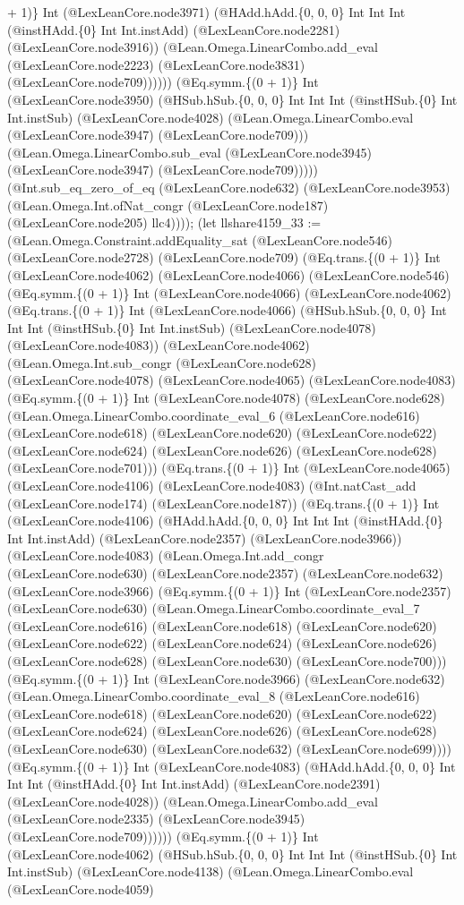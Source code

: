\documentclass[11pt]{article}
\begin{document}
+ 1)\} Int (@LexLeanCore.node3971) (@HAdd.hAdd.\{0, 0, 0\} Int Int Int (@instHAdd.\{0\} Int Int.instAdd) (@LexLeanCore.node2281) (@LexLeanCore.node3916)) (@Lean.Omega.LinearCombo.add\_eval (@LexLeanCore.node2223) (@LexLeanCore.node3831) (@LexLeanCore.node709)))))) (@Eq.symm.\{(0 + 1)\} Int (@LexLeanCore.node3950) (@HSub.hSub.\{0, 0, 0\} Int Int Int (@instHSub.\{0\} Int Int.instSub) (@LexLeanCore.node4028) (@Lean.Omega.LinearCombo.eval (@LexLeanCore.node3947) (@LexLeanCore.node709))) (@Lean.Omega.LinearCombo.sub\_eval (@LexLeanCore.node3945) (@LexLeanCore.node3947) (@LexLeanCore.node709))))) (@Int.sub\_eq\_zero\_of\_eq (@LexLeanCore.node632) (@LexLeanCore.node3953) (@Lean.Omega.Int.ofNat\_congr (@LexLeanCore.node187) (@LexLeanCore.node205) llc4)))); (let llshare4159\_33 := (@Lean.Omega.Constraint.addEquality\_sat (@LexLeanCore.node546) (@LexLeanCore.node2728) (@LexLeanCore.node709) (@Eq.trans.\{(0 + 1)\} Int (@LexLeanCore.node4062) (@LexLeanCore.node4066) (@LexLeanCore.node546) (@Eq.symm.\{(0 + 1)\} Int (@LexLeanCore.node4066) (@LexLeanCore.node4062) (@Eq.trans.\{(0 + 1)\} Int (@LexLeanCore.node4066) (@HSub.hSub.\{0, 0, 0\} Int Int Int (@instHSub.\{0\} Int Int.instSub) (@LexLeanCore.node4078) (@LexLeanCore.node4083)) (@LexLeanCore.node4062) (@Lean.Omega.Int.sub\_congr (@LexLeanCore.node628) (@LexLeanCore.node4078) (@LexLeanCore.node4065) (@LexLeanCore.node4083) (@Eq.symm.\{(0 + 1)\} Int (@LexLeanCore.node4078) (@LexLeanCore.node628) (@Lean.Omega.LinearCombo.coordinate\_eval\_6 (@LexLeanCore.node616) (@LexLeanCore.node618) (@LexLeanCore.node620) (@LexLeanCore.node622) (@LexLeanCore.node624) (@LexLeanCore.node626) (@LexLeanCore.node628) (@LexLeanCore.node701))) (@Eq.trans.\{(0 + 1)\} Int (@LexLeanCore.node4065) (@LexLeanCore.node4106) (@LexLeanCore.node4083) (@Int.natCast\_add (@LexLeanCore.node174) (@LexLeanCore.node187)) (@Eq.trans.\{(0 + 1)\} Int (@LexLeanCore.node4106) (@HAdd.hAdd.\{0, 0, 0\} Int Int Int (@instHAdd.\{0\} Int Int.instAdd) (@LexLeanCore.node2357) (@LexLeanCore.node3966)) (@LexLeanCore.node4083) (@Lean.Omega.Int.add\_congr (@LexLeanCore.node630) (@LexLeanCore.node2357) (@LexLeanCore.node632) (@LexLeanCore.node3966) (@Eq.symm.\{(0 + 1)\} Int (@LexLeanCore.node2357) (@LexLeanCore.node630) (@Lean.Omega.LinearCombo.coordinate\_eval\_7 (@LexLeanCore.node616) (@LexLeanCore.node618) (@LexLeanCore.node620) (@LexLeanCore.node622) (@LexLeanCore.node624) (@LexLeanCore.node626) (@LexLeanCore.node628) (@LexLeanCore.node630) (@LexLeanCore.node700))) (@Eq.symm.\{(0 + 1)\} Int (@LexLeanCore.node3966) (@LexLeanCore.node632) (@Lean.Omega.LinearCombo.coordinate\_eval\_8 (@LexLeanCore.node616) (@LexLeanCore.node618) (@LexLeanCore.node620) (@LexLeanCore.node622) (@LexLeanCore.node624) (@LexLeanCore.node626) (@LexLeanCore.node628) (@LexLeanCore.node630) (@LexLeanCore.node632) (@LexLeanCore.node699)))) (@Eq.symm.\{(0 + 1)\} Int (@LexLeanCore.node4083) (@HAdd.hAdd.\{0, 0, 0\} Int Int Int (@instHAdd.\{0\} Int Int.instAdd) (@LexLeanCore.node2391) (@LexLeanCore.node4028)) (@Lean.Omega.LinearCombo.add\_eval (@LexLeanCore.node2335) (@LexLeanCore.node3945) (@LexLeanCore.node709)))))) (@Eq.symm.\{(0 + 1)\} Int (@LexLeanCore.node4062) (@HSub.hSub.\{0, 0, 0\} Int Int Int (@instHSub.\{0\} Int Int.instSub) (@LexLeanCore.node4138) (@Lean.Omega.LinearCombo.eval (@LexLeanCore.node4059) 
\end{document}
